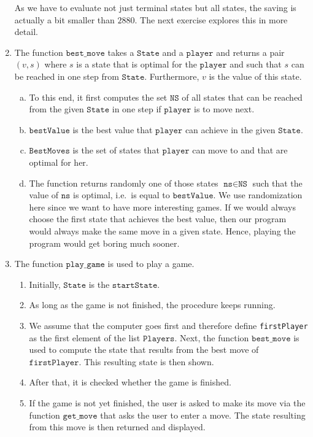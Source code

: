 \begin{enumerate}
      As we have to evaluate not just terminal states but all states, the saving is actually a bit smaller than
      $2880$.  The next exercise explores this in more detail.
\item The function $\texttt{best\_move}$ takes a $\texttt{State}$ and a $\texttt{player}$ and returns a pair $(v,s)$
      where $s$ is a state that is optimal for the $\texttt{player}$ and such that $s$ can be reached in one step from
      $\texttt{State}$.  Furthermore, $v$ is the value of this state.
      \begin{enumerate}[(a)]
      \item To this end, it first computes the set $\texttt{NS}$ of all states that can be reached 
            from the given $\texttt{State}$ in one step if $\texttt{player}$ is to move next.
      \item $\texttt{bestValue}$ is the best value that $\texttt{player}$ can achieve in the given $\texttt{State}$.
      \item $\texttt{BestMoves}$ is the set of states that  $\texttt{player}$ can move to and that are optimal
            for her.
      \item The function returns randomly one of those states $\texttt{ns} \in \texttt{NS}$ such that 
            the value of $\texttt{ns}$ is optimal, i.e.~is equal to $\texttt{bestValue}$.
            We use randomization here since we want to have more interesting games.  If we would always choose
            the first state that achieves the best value, then our program would always make the same move in
            a given state.  Hence, playing the program would get boring much sooner.
      \end{enumerate}
\item The function $\texttt{play\_game}$ is used to play a game.
      \begin{enumerate}
      \item Initially, $\texttt{State}$ is the $\texttt{startState}$.
      \item As long as the game is not finished, the procedure keeps running.
      \item We assume that the computer goes first and therefore define  \texttt{firstPlayer} as the first
            element of the list $\texttt{Players}$.  Next, the function $\texttt{best\_move}$ is used to
            compute the state that results from the best move of $\texttt{firstPlayer}$.
            This resulting state is then shown.
      \item After that, it is checked whether the game is finished.
      \item If the game is not  yet finished, the user is asked to make its move via the function
            $\texttt{get\_move}$ that asks the user to enter a move.
            The state resulting from this move is then returned and displayed.


\end{enumerate}
\end{enumerate}
